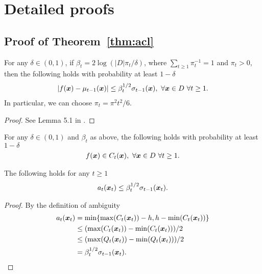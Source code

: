﻿\appendix
\chapter{Detailed proofs}

\section{Proof of Theorem~\ref*{thm:acl}} \label{sect:app_acl}

\begin{lemma}
\label{lem:srin1}
For any $\delta \in (0, 1)$, if $\beta_t = 2\log(|D|\pi_t/\delta)$, where
$\sum_{t\geq1}\pi_t^{-1} = 1$ and $\pi_t > 0$, then the following holds with
probability at least $1-\delta$
\begin{align*}
|f(\bm{x}) - \mu_{t-1}(\bm{x})| \leq \beta_t^{1/2}\sigma_{t-1}(\bm{x}),\ \forall \bm{x} \in D\ \forall t \geq 1.
\end{align*}
In particular, we can choose $\pi_t = \pi^2 t^2/6$.
\end{lemma}
\begin{proof}
See Lemma 5.1 in \cite{srinivas10}.
\end{proof}

\begin{cor}
\label{cor:cs}
For any $\delta \in (0, 1)$ and $\beta_t$ as above, the following holds
with probability at least $1-\delta$
\begin{align*}
f(\bm{x}) \in C_t(\bm{x}),\ \forall \bm{x} \in D\ \forall t \geq 1.
\end{align*}
\end{cor}

\begin{lemma}
\label{lem:wb}
The following holds for any $t \geq 1$
\begin{align*}
a_t(\bm{x}_t) \leq \beta_t^{1/2}\sigma_{t-1}(\bm{x}_t).
\end{align*}
\end{lemma}
\begin{proof}
By the definition of ambiguity
\begin{align*}
a_t(\bm{x}_t) &= \min\{\max(C_t(\bm{x}_t)) - h, h - \min(C_t(\bm{x}_t))\}\\
           &\leq (\max(C_t(\bm{x}_t)) - \min(C_t(\bm{x}_t)))/2\\
           &\leq (\max(Q_t(\bm{x}_t)) - \min(Q_t(\bm{x}_t)))/2\\
           &= \beta_t^{1/2}\sigma_{t-1}(\bm{x}_t).
\end{align*}
\end{proof}

